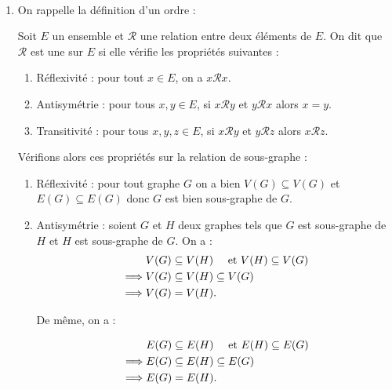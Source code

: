 \begin{td-sol}[]\, %
    \begin{enumerate}
        \item On rappelle la d\'efinition d'un ordre :
        
        \begin{definition}
            Soit \(E\) un ensemble et \(\mathcal{R}\) une relation entre deux \'el\'ements de \(E\).
            On dit que \(\mathcal{R}\) est une  sur \(E\) si elle v\'erifie les propri\'et\'es suivantes :
            \begin{enumerate}[label=\roman*)]
                \item R\'eflexivit\'e : pour tout \(x \in E\), on a \(x\mathcal{R}x\).
                \item Antisym\'etrie : pour tous \(x,y\in E\), si \(x\mathcal{R}y\) et \(y\mathcal{R}x\) alors \(x = y\).
                \item Transitivit\'e : pour tous \(x,y,z\in E\), si \(x\mathcal{R}y\) et \(y\mathcal{R}z\) alors \(x\mathcal{R}z\).
            \end{enumerate}
        \end{definition}

        V\'erifions alors ces propri\'et\'es sur la relation de sous-graphe :
        \begin{enumerate}
            \item R\'eflexivit\'e : pour tout graphe \(G\) on a bien \(V(G) \subseteq V(G)\) et \(E(G) \subseteq E(G)\) donc \(G\) est bien sous-graphe de \(G\).

            \item Antisym\'etrie : soient \(G\) et \(H\) deux graphes tels que \(G\) est sous-graphe de \(H\) et \(H\) est sous-graphe de \(G\).
            On a :
            \begin{equation*}
                \begin{aligned}
                    \hphantom{\implies} & V(G) \subseteq V(H) \quad \text{ et } V(H) \subseteq V(G) \\
                    \implies & V(G) \subseteq V(H) \subseteq V(G) \\
                    \implies & V(G) = V(H).
                \end{aligned}
            \end{equation*}

            De m\^eme, on a :
            
            \begin{equation*}
                \begin{aligned}
                    \hphantom{\implies} & E(G) \subseteq E(H) \quad \text{ et } E(H) \subseteq E(G) \\
                    \implies & E(G) \subseteq E(H) \subseteq E(G) \\
                    \implies & E(G) = E(H).
                \end{aligned}
            \end{equation*}


\end{enumerate}
\end{enumerate}
\end{td-sol}
